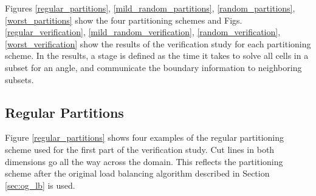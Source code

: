 Figures \ref{regular_partitions}, \ref{mild_random_partitions}, \ref{random_partitions}, \ref{worst_partitions} show the four partitioning schemes and Figs. \ref{regular_verification}, \ref{mild_random_verification}, \ref{random_verification}, \ref{worst_verification} show the results of the verification study for each partitioning scheme. In the results, a stage is defined as the time it takes to solve all cells in a subset for an angle, and communicate the boundary information to neighboring subsets.

\subsection{Regular Partitions}

Figure \ref{regular_partitions} shows four examples of the regular partitioning scheme used for the first part of the verification study. Cut lines in both dimensions go all the way across the domain. This reflects the partitioning scheme after the original load balancing algorithm described in Section \ref{sec:og_lb} is used.

